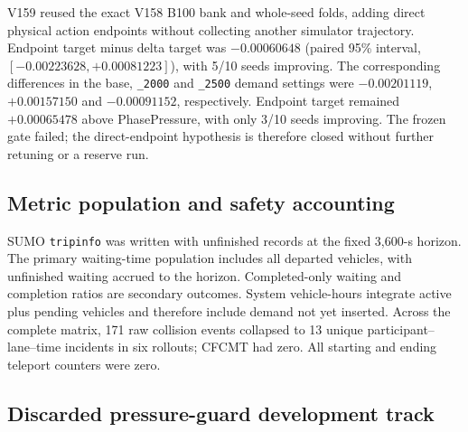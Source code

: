 V159 reused the exact V158 B100 bank and whole-seed folds, adding direct
physical action endpoints without collecting another simulator trajectory.
Endpoint target minus delta target was $-0.00060648$ (paired 95\% interval,
$[-0.00223628,+0.00081223]$), with 5/10 seeds improving.  The corresponding
differences in the base, \texttt{\_2000} and \texttt{\_2500} demand settings
were $-0.00201119$, $+0.00157150$ and $-0.00091152$, respectively.  Endpoint
target remained $+0.00065478$ above PhasePressure, with only 3/10 seeds
improving.  The frozen gate failed; the direct-endpoint hypothesis is therefore
closed without further retuning or a reserve run.

\begin{table}[htbp]
\caption{Post-V148 source-remedy ladder.  Effects are normalized action-regret
differences unless seconds or percentages are shown; negative values favour
the source-aware arm.  The
V157C row reports descriptive means over two valid seeds because the fixed
three-seed protocol was incomplete.  The V158 row reports the preregistered
ten-seed OOF estimates; its gate failed and the reserve was withheld.  The V159
row reports the target-only direct-endpoint ablation; its OOF gate also failed.
The versioned evidence identifiers are retained in the machine-readable source
data, not in the displayed table.}
\label{tab:source-remedy-ladder}
\centering
\scriptsize

\end{table}

\subsection{Metric population and safety accounting}
\label{sec:supp-metric-safety}

SUMO \texttt{tripinfo} was written with unfinished records at the fixed
3,600-s horizon.  The primary waiting-time population includes all departed
vehicles, with unfinished waiting accrued to the horizon.  Completed-only
waiting and completion ratios are secondary outcomes.  System vehicle-hours
integrate active plus pending vehicles and therefore include demand not yet
inserted.  Across the complete matrix, 171 raw collision events collapsed to
13 unique participant--lane--time incidents in six rollouts; CFCMT had zero.
All starting and ending teleport counters were zero.

\subsection{Discarded pressure-guard development track}
\label{sec:supp-discarded-guard}

